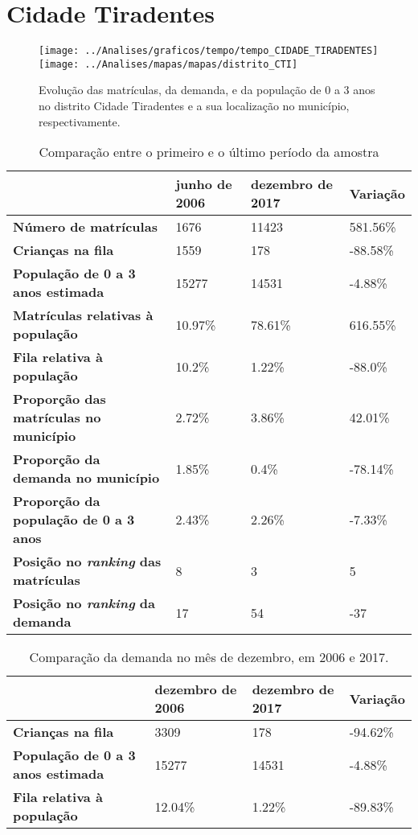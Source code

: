 \section{Cidade Tiradentes}
\begin{figure}[H]
\centering
\texttt{[image: ../Analises/graficos/tempo/tempo\_CIDADE\_TIRADENTES]}
\texttt{[image: ../Analises/mapas/mapas/distrito\_CTI]}
\caption{Evolução das matrículas, da demanda, e da população de 0 a 3 anos no distrito Cidade Tiradentes e a sua localização no município, respectivamente.}
\end{figure}
\begin{table}[H]
\begin{tabular}{l|l|l|l}
\textbf{}                                      & \textbf{junho de 2006}       & \textbf{dezembro de 2017}    & \textbf{Variação} \\ \hline
\textbf{Número de matrículas}                  & 1676 & 11423 & 581.56\% \\ \hline
\textbf{Crianças na fila}                      & 1559 & 178 & -88.58\% \\ \hline
\textbf{População de 0 a 3 anos estimada}      & 15277 & 14531 & -4.88\% \\ \hline
\textbf{Matrículas relativas à população}      & 10.97\% & 78.61\% & 616.55\% \\ \hline
\textbf{Fila relativa à população}             & 10.2\% & 1.22\% & -88.0\% \\ \hline
\textbf{Proporção das matrículas no município} & 2.72\% & 3.86\% & 42.01\% \\ \hline
\textbf{Proporção da demanda no município}     & 1.85\% & 0.4\% & -78.14\% \\ \hline
\textbf{Proporção da população de 0 a 3 anos}  & 2.43\% & 2.26\% & -7.33\% \\ \hline
\textbf{Posição no \textit{ranking} das matrículas}     & 8 & 3 & 5 \\ \hline
\textbf{Posição no \textit{ranking} da demanda}         & 17 & 54 & -37 \\ 
\end{tabular}
\caption{Comparação entre o primeiro e o último período da amostra}
\end{table}
\begin{table}[H]
\begin{tabular}{l|l|l|l}
\textbf{}                                 & \textbf{dezembro de 2006} & \textbf{dezembro de 2017} & \textbf{Variação} \\ \hline
\textbf{Crianças na fila}                      & 3309 & 178 & -94.62\% \\ \hline
\textbf{População de 0 a 3 anos estimada}      & 15277 & 14531 & -4.88\% \\ \hline
\textbf{Fila relativa à população}             & 12.04\% & 1.22\% & -89.83\% \\
\end{tabular}
\caption{Comparação da demanda no mês de dezembro, em 2006 e 2017.}
\end{table}
